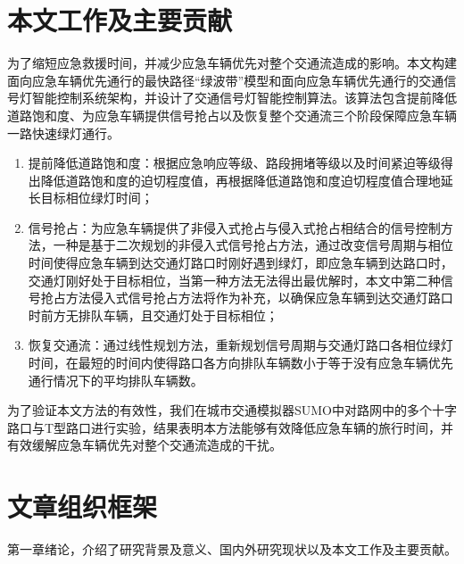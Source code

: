 \section{本文工作及主要贡献}
为了缩短应急救援时间，并减少应急车辆优先对整个交通流造成的影响。本文构建面向应急车辆优先通行的最快路径“绿波带”模型和面向应急车辆优先通行的交通信号灯智能控制系统架构，并设计了交通信号灯智能控制算法。该算法包含提前降低道路饱和度、为应急车辆提供信号抢占以及恢复整个交通流三个阶段保障应急车辆一路快速绿灯通行。

\begin{enumerate}
	\item 提前降低道路饱和度：根据应急响应等级、路段拥堵等级以及时间紧迫等级得出降低道路饱和度的迫切程度值，再根据降低道路饱和度迫切程度值合理地延长目标相位绿灯时间；
	
	\item 信号抢占：为应急车辆提供了非侵入式抢占与侵入式抢占相结合的信号控制方法，一种是基于二次规划的非侵入式信号抢占方法，通过改变信号周期与相位时间使得应急车辆到达交通灯路口时刚好遇到绿灯，即应急车辆到达路口时，交通灯刚好处于目标相位，当第一种方法无法得出最优解时，本文中第二种信号抢占方法侵入式信号抢占方法将作为补充，以确保应急车辆到达交通灯路口时前方无排队车辆，且交通灯处于目标相位；
	\item 恢复交通流：通过线性规划方法，重新规划信号周期与交通灯路口各相位绿灯时间，在最短的时间内使得路口各方向排队车辆数小于等于没有应急车辆优先通行情况下的平均排队车辆数。
\end{enumerate}

为了验证本文方法的有效性，我们在城市交通模拟器SUMO\cite{behrisch2011sumo}中对路网中的多个十字路口与T型路口进行实验，结果表明本方法能够有效降低应急车辆的旅行时间，并有效缓解应急车辆优先对整个交通流造成的干扰。


\section{文章组织框架}
第一章绪论，介绍了研究背景及意义、国内外研究现状以及本文工作及主要贡献。


